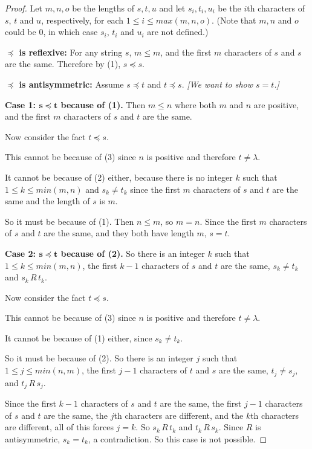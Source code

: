 \documentclass[14pt]{extarticle}
\begin{document}
\begin{proof}
        Let $m,n,o$ be the lengths of $s,t,u$ and let \(s_i, t_i, u_i\) be the $i$th characters of $s$, $t$ and $u$,
        respectively, for each \(1 \leq i \leq max(m, n, o)\). (Note that $m,n$ and $o$ could be 0, in which case \(s_i\), \(t_i\) and \(u_i\) are not defined.)

        {\bf \(\bm{\preceq}\) is reflexive:} For any string $s$, \(m \leq m\), and the first $m$ characters of $s$ and $s$
        are the same. Therefore by (1), \(s \preceq s\).

                {\bf \(\bm{\preceq}\) is antisymmetric:} Assume \(s \preceq t\) and \(t \preceq s\). {\it [We want to show $s=t$.]}

                {\bf Case 1: \(\bm{s \preceq t}\) because of (1).} Then \(m \leq n\) where both $m$ and $n$ are positive, and the first
        $m$ characters of $s$ and $t$ are the same.

        Now consider the fact \(t \preceq s\).

        This cannot be because of (3) since $n$ is positive and therefore \(t \neq \lambda\).

        It cannot be because of (2) either, because there is no integer $k$ such that \(1 \leq k \leq min(m,n)\) and \(s_k \neq t_k\) since the first $m$ characters of $s$ and $t$ are the same and the length of $s$ is $m$.

        So it must be because of (1). Then \(n \leq m\), so \(m = n\). Since the first $m$ characters of $s$ and $t$ are the
        same, and they both have length $m$, \(s = t\).

                {\bf Case 2: \(\bm{s \preceq t}\) because of (2).} So there is an integer $k$ such that \(1 \leq k \leq min(m,n)\), the
        first $k-1$ characters of $s$ and $t$ are the same, \(s_k \neq t_k\) and \(s_k \,R\, t_k\).

        Now consider the fact \(t \preceq s\).

        This cannot be because of (3) since $n$ is positive and therefore \(t \neq \lambda\).

        It cannot be because of (1) either, since \(s_k \neq t_k\).

        So it must be because of (2). So there is an integer $j$ such that \(1 \leq j \leq min(n,m)\), the first $j-1$
        characters of $t$ and $s$ are the same, \(t_j \neq s_j\), and \(t_j \,R\, s_j\).

        Since the first $k-1$ characters of $s$ and $t$ are the same, the first $j-1$ characters of $s$ and $t$ are the
        same, the $j$th characters are different, and the $k$th characters are different, all of this forces $j=k$. So
        \(s_k \,R\, t_k\) and \(t_k \,R\, s_k\). Since $R$ is antisymmetric, \(s_k = t_k\), a contradiction.
        So this case is not possible.


\end{proof}
\end{document}
